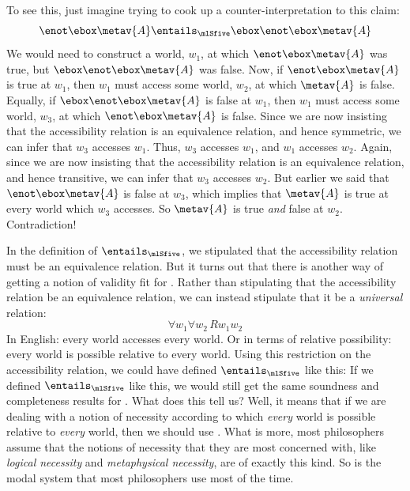 To see this, just imagine trying to cook up a counter-interpretation to this claim:
\[
	\enot\ebox\metav{A} \entails_\mlSfive  \ebox \enot\ebox \metav{A}
\]
We would need to construct a world, $w_1$, at which $\enot\ebox\metav{A}$ was true, but $\ebox \enot\ebox \metav{A}$ was false.
Now, if $\enot\ebox\metav{A}$ is true at $w_1$, then $w_1$ must access some world, $w_2$, at which $\metav{A}$ is false. Equally, if $\ebox \enot\ebox \metav{A}$ is false at $w_1$, then $w_1$ must access some world, $w_3$, at which $\enot\ebox \metav{A}$ is false. Since we are now insisting that the accessibility relation is an equivalence relation, and hence symmetric, we can infer that $w_3$ accesses $w_1$. Thus, $w_3$ accesses $w_1$, and $w_1$ accesses $w_2$. Again, since we are now insisting that the accessibility relation is an equivalence relation, and hence transitive, we can infer that $w_3$ accesses $w_2$. But earlier we said that $\enot\ebox \metav{A}$ is false at $w_3$, which implies that $\metav{A}$ is true at every world which $w_3$ accesses. So $\metav{A}$ is true \emph{and} false at $w_2$. Contradiction!

In the definition of $\entails_\mlSfive $, we stipulated that the accessibility relation must be an equivalence relation. But it turns out that there is another way of getting a notion of validity fit for \mlSfive. Rather than stipulating that the accessibility relation be an equivalence relation, we can instead stipulate that it be a \emph{universal} relation:
\[\forall w_1\forall w_2\, Rw_1w_2\]
In English: every world accesses every world. Or in terms of relative possibility: every world is possible relative to every world. Using this restriction on the accessibility relation, we could have defined $\entails_\mlSfive $ like this:
If we defined $\entails_\mlSfive $ like this, we would still get the same soundness and completeness results for \mlSfive. What does this tell us? Well, it means that if we are dealing with a notion of necessity according to which \emph{every} world is possible relative to \emph{every} world, then we should use \mlSfive. What is more, most philosophers assume that the notions of necessity that they are most concerned with, like \emph{logical necessity} and \emph{metaphysical necessity}, are of exactly this kind. So \mlSfive{} is the modal system that most philosophers use most of the time.

